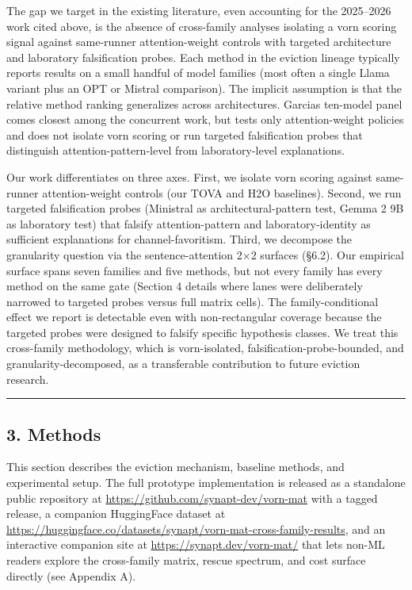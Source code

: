 \documentclass[
]{article}
\begin{document}
The gap we target in the existing literature, even accounting for the
2025--2026 work cited above, is the absence of cross-family analyses
isolating a vorn scoring signal against same-runner
attention-weight controls with targeted architecture and laboratory
falsification probes. Each method in the eviction lineage typically
reports results on a small handful of model families (most often a
single Llama variant plus an OPT or Mistral comparison). The implicit
assumption is that the relative method ranking generalizes across
architectures. Garcia\textquotesingle s ten-model panel comes closest
among the concurrent work, but tests only attention-weight policies and
does not isolate vorn scoring or run targeted
falsification probes that distinguish attention-pattern-level from
laboratory-level explanations.

Our work differentiates on three axes. First, we isolate
vorn scoring against same-runner attention-weight controls
(our TOVA and H2O baselines). Second, we run targeted
falsification probes (Ministral as architectural-pattern test, Gemma
2 9B as laboratory test) that falsify attention-pattern and
laboratory-identity as sufficient explanations for channel-favoritism. Third, we decompose the granularity question via the
sentence-attention 2×2 surfaces (§6.2). Our empirical surface spans seven
families and five methods, but not every family has every method on the
same gate (Section 4 details where lanes were deliberately narrowed to
targeted probes versus full matrix cells). The family-conditional effect
we report is detectable even with non-rectangular coverage because the
targeted probes were designed to falsify specific hypothesis classes. We
treat this cross-family methodology, which is
vorn-isolated, falsification-probe-bounded, and
granularity-decomposed, as a transferable contribution to future
eviction research.

\begin{center}\rule{0.5\linewidth}{0.5pt}\end{center}

\subsection{3. Methods}\label{3-methods}

This section describes the eviction mechanism, baseline methods, and
experimental setup. The full prototype implementation is released as a
standalone public repository at
\href{https://github.com/synapt-dev/vorn-mat}{\url{https://github.com/synapt-dev/vorn-mat}}
with a tagged release, a companion HuggingFace dataset at
\href{https://huggingface.co/datasets/synapt/vorn-mat-cross-family-results}{\url{https://huggingface.co/datasets/synapt/vorn-mat-cross-family-results}},
and an interactive companion site at
\href{https://synapt.dev/vorn-mat/}{\url{https://synapt.dev/vorn-mat/}}
that lets non-ML readers explore the cross-family matrix, rescue
spectrum, and cost surface directly (see Appendix A).
\end{document}

